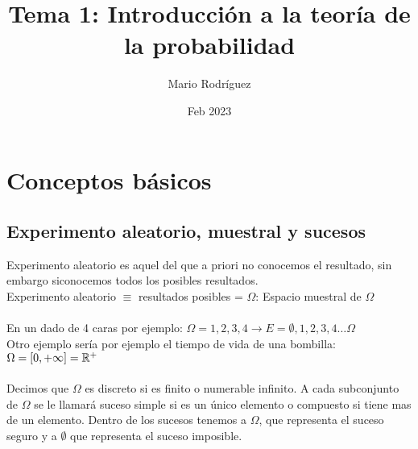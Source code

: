 \documentclass{article}
\title{Tema 1: Introducción a la teoría de la probabilidad}
\author{Mario Rodríguez}
\date{Feb 2023}
\begin{document}
\maketitle
\section{Conceptos básicos}
\subsection{Experimento aleatorio, muestral y sucesos}
Experimento aleatorio es aquel del que a priori no conocemos el resultado, sin embargo siconocemos todos los posibles resultados.\\

Experimento aleatorio $\equiv$ {resultados posibles} = $\Omega$: Espacio muestral de $\Omega$
\\
\\En un dado de 4 caras por ejemplo: $\Omega = {1,2,3,4} \rightarrow E={{\emptyset},{1},{2},{3},{4}\ldots{\Omega}}$
\\Otro ejemplo sería por ejemplo el tiempo de vida de una bombilla: $\Omega = [0,+\infty]=\mathbb{R}\textsuperscript{+}$
\\
\\Decimos que $\Omega$ es discreto si es finito o numerable infinito. A cada subconjunto de $\Omega$ se le llamará suceso simple si es un único elemento o compuesto si tiene mas de un elemento. Dentro de los sucesos tenemos a $\Omega$, que representa el suceso seguro y a $\emptyset$ que representa el suceso imposible.
\\
\end{document}
